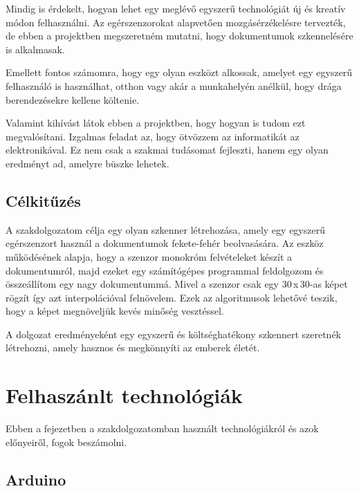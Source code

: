 \documentclass[]{thesis-ekf}
\theoremstyle{definition}
\theoremstyle{remark}
\begin{document}
Mindig is érdekelt, hogyan lehet egy meglévő egyszerű technológiát új és kreatív módon felhasználni. Az egérszenzorokat alapvetően mozgásérzékelésre tervezték, de ebben a projektben megszeretném mutatni, hogy dokumentumok szkennelésére is alkalmasak.

Emellett fontos számomra, hogy egy olyan eszközt alkossak, amelyet egy egyszerű felhasználó is használhat, otthon vagy akár a munkahelyén anélkül, hogy drága berendezésekre kellene költenie. 

Valamint kihívást látok ebben a projektben, hogy hogyan is tudom ezt megvalósítani. Izgalmas feladat az, hogy ötvözzem az informatikát az elektronikával. Ez nem csak a szakmai tudásomat fejleszti, hanem egy olyan eredményt ad, amelyre büszke lehetek.
\section{Célkitűzés}
A szakdolgozatom\cite{szakdolgozat} célja egy olyan szkenner létrehozása, amely egy egyszerű egérszenzort használ a dokumentumok fekete-fehér beolvasására. Az eszköz működésének alapja, hogy a szenzor monokróm felvételeket készít a dokumentumról, majd ezeket egy számítógépes programmal feldolgozom és összeállítom egy nagy dokumentummá. Mivel a szenzor csak egy 30\,x\,30-as képet rögzít így azt interpolációval felnövelem. Ezek az algoritmusok lehetővé teszik, hogy a képet megnöveljük kevés minőség vesztéssel. 

A dolgozat eredményeként egy egyszerű és költséghatékony szkennert szeretnék létrehozni, amely hasznos és megkönnyíti az emberek életét.
\chapter{Felhaszánlt technológiák}
Ebben a fejezetben a szakdolgozatomban használt technológiákról és azok előnyeiről, fogok beszámolni.
\section{Arduino}
\end{document}
